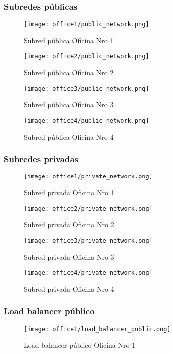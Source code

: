 \subsubsection{Subredes públicas}
\begin{figure}[H]
    \centering
    \texttt{[image: office1/public\_network.png]}
    \caption{Subred pública Oficina Nro 1}
\end{figure}
\begin{figure}[H]
    \centering
    \texttt{[image: office2/public\_network.png]}
    \caption{Subred pública Oficina Nro 2}
\end{figure}
\begin{figure}[H]
    \centering
    \texttt{[image: office3/public\_network.png]}
    \caption{Subred pública Oficina Nro 3}
\end{figure}
\begin{figure}[H]
    \centering
    \texttt{[image: office4/public\_network.png]}
    \caption{Subred pública Oficina Nro 4}
\end{figure}



\subsubsection{Subredes privadas}
\begin{figure}[H]
    \centering
    \texttt{[image: office1/private\_network.png]}
    \caption{Subred privada Oficina Nro 1}
\end{figure}

\begin{figure}[H]
    \centering
    \texttt{[image: office2/private\_network.png]}
    \caption{Subred privada Oficina Nro 2}
\end{figure}

\begin{figure}[H]
    \centering
    \texttt{[image: office3/private\_network.png]}
    \caption{Subred privada Oficina Nro 3}
\end{figure}

\begin{figure}[H]
    \centering
    \texttt{[image: office4/private\_network.png]}
    \caption{Subred privada Oficina Nro 4}
\end{figure}


\subsubsection{Load balancer público}
\begin{figure}[H]
    \centering
    \texttt{[image: office1/load\_balancer\_public.png]}
    \caption{Load balancer público Oficina Nro 1}
\end{figure}


